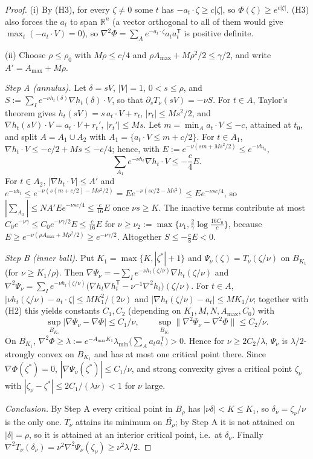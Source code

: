 \documentclass[11pt]{article}
\theoremstyle{remark}\newtheorem{remark}[theorem]{Remark}
\newcommand{\R}{\mathbb R}\newcommand{\Z}{\mathbb Z}
\begin{document}
\begin{proof}
(i) By (H3), for every $\zeta\ne0$ some $t$ has $-a_t\cdot\zeta\ge c|\zeta|$, so $\Phi(\zeta)\ge e^{c|\zeta|}$. (H3) also forces the $a_t$ to span $\R^n$ (a vector orthogonal to all of them would give $\max_t(-a_t\cdot V)=0$), so $\nabla^2\Phi=\sum_Ae^{-a_t\cdot\zeta}a_ta_t^{\mathsf T}$ is positive definite.

(ii) Choose $\rho\le\rho_0$ with $M\rho\le c/4$ and $\rho A_{\max}+M\rho^2/2\le\gamma/2$, and write $A'=A_{\max}+M\rho$.

\emph{Step A (annulus).} Let $\delta=sV$, $|V|=1$, $0<s\le\rho$, and $S:=\sum_Ie^{-\nu h_t(\delta)}\nabla h_t(\delta)\cdot V$, so that $\partial_sT_\nu(sV)=-\nu S$. For $t\in A$, Taylor's theorem gives $h_t(sV)=s\,a_t\cdot V+r_t$, $|r_t|\le Ms^2/2$, and $\nabla h_t(sV)\cdot V=a_t\cdot V+r_t'$, $|r_t'|\le Ms$. Let $m=\min_Aa_t\cdot V\le-c$, attained at $t_0$, and split $A=A_1\cup A_2$ with $A_1=\{a_t\cdot V\le m+c/2\}$. For $t\in A_1$, $\nabla h_t\cdot V\le-c/2+Ms\le-c/4$; hence, with $E:=e^{-\nu(sm+Ms^2/2)}\le e^{-\nu h_{t_0}}$,
\[\textstyle\sum_{A_1}e^{-\nu h_t}\nabla h_t\cdot V\le-\frac c4E .\]
For $t\in A_2$, $|\nabla h_t\cdot V|\le A'$ and $e^{-\nu h_t}\le e^{-\nu(s(m+c/2)-Ms^2/2)}=Ee^{-\nu(sc/2-Ms^2)}\le Ee^{-\nu sc/4}$, so $|\sum_{A_2}|\le NA'Ee^{-\nu sc/4}\le\frac c{16}E$ once $\nu s\ge K$. The inactive terms contribute at most $C_0e^{-\nu\gamma}\le C_0e^{-\nu\gamma/2}E\le\frac c{16}E$ for $\nu\ge\nu_2:=\max\{\nu_1,\frac2\gamma\log\frac{16C_0}c\}$, because $E\ge e^{-\nu(\rho A_{\max}+M\rho^2/2)}\ge e^{-\nu\gamma/2}$. Altogether $S\le-\frac c8E<0$.

\emph{Step B (inner ball).} Put $K_1=\max\{K,|\zeta^*|+1\}$ and $\Psi_\nu(\zeta)=T_\nu(\zeta/\nu)$ on $B_{K_1}$ (for $\nu\ge K_1/\rho$). Then
$\nabla\Psi_\nu=-\sum_Ie^{-\nu h_t(\zeta/\nu)}\nabla h_t(\zeta/\nu)$ and $\nabla^2\Psi_\nu=\sum_Ie^{-\nu h_t(\zeta/\nu)}\bigl(\nabla h_t\nabla h_t^{\mathsf T}-\nu^{-1}\nabla^2h_t\bigr)(\zeta/\nu)$. For $t\in A$, $|\nu h_t(\zeta/\nu)-a_t\cdot\zeta|\le MK_1^2/(2\nu)$ and $|\nabla h_t(\zeta/\nu)-a_t|\le MK_1/\nu$; together with (H2) this yields constants $C_1,C_2$ (depending on $K_1,M,N,A_{\max},C_0$) with
\[\sup_{B_{K_1}}|\nabla\Psi_\nu-\nabla\Phi|\le C_1/\nu,\qquad\sup_{B_{K_1}}\|\nabla^2\Psi_\nu-\nabla^2\Phi\|\le C_2/\nu .\]
On $B_{K_1}$, $\nabla^2\Phi\ge\lambda:=e^{-A_{\max}K_1}\lambda_{\min}\bigl(\sum_Aa_ta_t^{\mathsf T}\bigr)>0$. Hence for $\nu\ge2C_2/\lambda$, $\Psi_\nu$ is $\lambda/2$-strongly convex on $B_{K_1}$ and has at most one critical point there. Since $\nabla\Phi(\zeta^*)=0$, $|\nabla\Psi_\nu(\zeta^*)|\le C_1/\nu$, and strong convexity gives a critical point $\zeta_\nu$ with $|\zeta_\nu-\zeta^*|\le2C_1/(\lambda\nu)<1$ for $\nu$ large.

\emph{Conclusion.} By Step A every critical point in $B_\rho$ has $|\nu\delta|<K\le K_1$, so $\delta_\nu=\zeta_\nu/\nu$ is the only one. $T_\nu$ attains its minimum on $\overline{B_\rho}$; by Step A it is not attained on $|\delta|=\rho$, so it is attained at an interior critical point, i.e.\ at $\delta_\nu$. Finally $\nabla^2T_\nu(\delta_\nu)=\nu^2\nabla^2\Psi_\nu(\zeta_\nu)\ge\nu^2\lambda/2$.
\end{proof}
\end{document}
